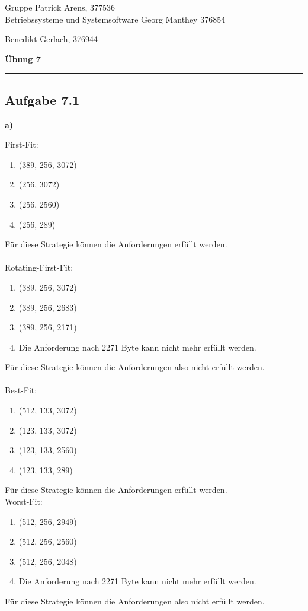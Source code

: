 \documentclass[a4paper,graphics,11pt]{article}
\newcommand{\aufgabe}[1]{\subsection*{Aufgabe #1}}
\begin{document}
\noindent Gruppe              \hfill Patrick Arens, 377536\\
\noindent Betriebssysteme und Systemsoftware    \hfill Georg Manthey 376854\\
\strut\hfill Benedikt Gerlach, 376944\\
\begin{center}
	\LARGE{\textbf{Übung 7}}
\end{center}
\begin{center}
\rule[0.1ex]{\textwidth}{1pt}
\end{center}

\aufgabe{7.1}

\textbf{a)}

First-Fit:
\begin{enumerate}
    \item (389, 256, 3072)
    \item (256, 3072)
    \item (256, 2560)
    \item (256, 289)
\end{enumerate}
Für diese Strategie können die Anforderungen erfüllt werden.\\
\ \\
Rotating-First-Fit:
\begin{enumerate}
    \item (389, 256, 3072)
    \item (389, 256, 2683)
    \item (389, 256, 2171)
    \item Die Anforderung nach 2271 Byte kann nicht mehr erfüllt werden.
\end{enumerate}
Für diese Strategie können die Anforderungen also nicht erfüllt werden.\\
\ \\
Best-Fit:
\begin{enumerate}
    \item (512, 133, 3072)
    \item (123, 133, 3072)
    \item (123, 133, 2560)
    \item (123, 133, 289)
\end{enumerate}
Für diese Strategie können die Anforderungen erfüllt werden.\\
\newpage
Worst-Fit:
\begin{enumerate}
    \item (512, 256, 2949)
    \item (512, 256, 2560)
    \item (512, 256, 2048)
    \item Die Anforderung nach 2271 Byte kann nicht mehr erfüllt werden.
\end{enumerate}
Für diese Strategie können die Anforderungen also nicht erfüllt werden.\\
\end{document}
